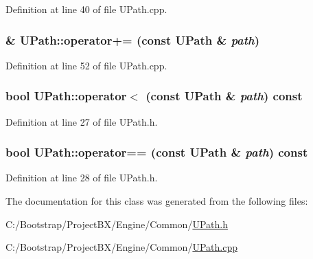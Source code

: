 Definition at line 40 of file UPath.cpp.\hypertarget{class_u_path_2781fca7f2df94013f4c93ff85758929}{
\subsubsection[{operator+=}]{ \& UPath::operator+= (const {\bf UPath} \& {\em path})}}
\label{class_u_path_2781fca7f2df94013f4c93ff85758929}




Definition at line 52 of file UPath.cpp.\hypertarget{class_u_path_e057c5273fcc56515e04ca0aac2d09e0}{
\subsubsection[{operator$<$}]{\setlength{\rightskip}{0pt plus 5cm}bool UPath::operator$<$ (const {\bf UPath} \& {\em path}) const}}
\label{class_u_path_e057c5273fcc56515e04ca0aac2d09e0}




Definition at line 27 of file UPath.h.\hypertarget{class_u_path_24dac9415fb7ab9696e94a3a0f6ba61b}{
\subsubsection[{operator==}]{\setlength{\rightskip}{0pt plus 5cm}bool UPath::operator== (const {\bf UPath} \& {\em path}) const}}
\label{class_u_path_24dac9415fb7ab9696e94a3a0f6ba61b}




Definition at line 28 of file UPath.h.

The documentation for this class was generated from the following files:\begin{CompactItemize}
\item 
C:/Bootstrap/ProjectBX/Engine/Common/\hyperlink{_u_path_8h}{UPath.h}\item 
C:/Bootstrap/ProjectBX/Engine/Common/\hyperlink{_u_path_8cpp}{UPath.cpp}\end{CompactItemize}
